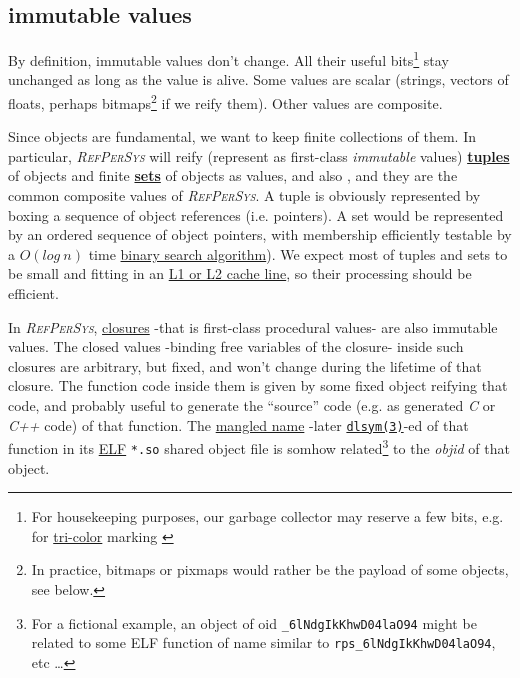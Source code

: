 \documentclass[11pt,a4paper,svgnames]{article}
\newcommand{\RefPerSys}{{\textit{\textsc{RefPerSys}}}}
\begin{document}
\subsection{immutable values}
\label{subsec:immutable-values}

By definition, immutable values don't change. All their useful
bits\footnote{For housekeeping purposes, our garbage collector may
reserve a few bits, e.g. for
\href{https://www.memorymanagement.org/glossary/t.html}{tri-color}
marking \cite{wilson:1992:uniprocessorgc}} stay unchanged as long as
the value is alive. Some values are scalar (strings, vectors of
floats, perhaps bitmaps\footnote{In practice, bitmaps or pixmaps would
rather be the payload of some objects, see below.} if we reify
them). Other values are composite.

Since objects are fundamental, we want to keep finite collections of
them. In particular, {\RefPerSys} will reify (represent as first-class
\emph{immutable} values)
\href{https://en.wikipedia.org/wiki/Tuple}{\textbf{tuples}}
 of objects and finite
\href{https://en.wikipedia.org/wiki/Set_(abstract_data_type)}{\textbf{sets}}
of objects as values, and also , and they are the common composite
values of \RefPerSys. A tuple is obviously represented by boxing a
sequence of object references (i.e. pointers). A set would be
represented by an ordered sequence of object pointers, with membership
efficiently testable by a
\href{https://en.wikipedia.org/wiki/Time\_complexity}{$O(log~ n)$}
time
\href{https://en.wikipedia.org/wiki/Binary_search_algorithm}{binary
  search algorithm}). We expect most of tuples and sets to be small
and fitting in an
\href{https://en.wikipedia.org/wiki/Cache\_hierarchy}{L1 or L2 cache
  line}, so their processing should be efficient.

In {\RefPerSys},
\href{https://en.wikipedia.org/wiki/Closure_(computer_programming)}{closures}
-that is first-class procedural values- are also immutable values. The
closed values -binding free variables of the closure- inside such
closures are arbitrary, but fixed, and won't change during the
lifetime of that closure. The function code inside them is given by
some fixed object reifying that code, and probably useful to generate
the ``source'' code (e.g. as generated \emph{C} or \emph{C++} code) of
that function. The
\href{https://en.wikipedia.org/wiki/Name_mangling}{mangled name}
-later
\href{http://man7.org/linux/man-pages/man3/dlsym.3.html}{\texttt{dlsym(3)}}-ed
of that function in its
\href{https://en.wikipedia.org/wiki/Executable_and_Linkable_Format}{ELF}
\texttt{*.so} shared object file is somhow related\footnote{For a
fictional example, an object of oid \texttt{\_6lNdgIkKhwD04laO94}
might be related to some ELF function of name similar to
\texttt{rps\_6lNdgIkKhwD04laO94}, etc \ldots} to the \emph{objid} of
that object.
\end{document}
